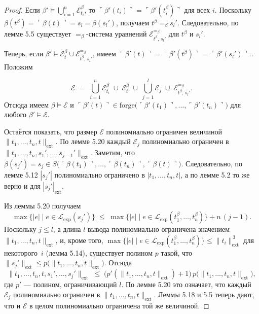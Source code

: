 \begin{proof}
Если \(\beta' \models \bigcup_{i=1}^{n}\mathcal E_{t_i}^{\beta}\),
то \(\ulcorner\beta'(t_i)\urcorner=\ulcorner\beta'(t_i^{\beta})\urcorner\)
для всех \(i\).
Поскольку \(\beta(t^{\beta})=\ulcorner\beta(t)\urcorner=s_{l}=\beta(s_{l}')\),
получаем \(t^{\beta}=_{\beta} s_{l}'\).
Следовательно, по лемме 5.5 существует
\(=_{\beta}\)-система уравнений
\(\mathcal E_{t^{\beta},\,s_{l}'}^{=_{\beta}}\) для \(t^{\beta}\) и \(s_{l}'\).

\smallskip
Теперь, если
\(\beta' \models \mathcal E_{t}^{\beta}\cup\mathcal E_{t^{\beta},\,s_{l}'}^{=_{\beta}}\),
имеем
\(
  \ulcorner\beta'(t)\urcorner
  =\ulcorner\beta'(t^{\beta})\urcorner
  =\ulcorner\beta'(s_{l}')\urcorner.
\). Положим

\[
  \mathcal E \;=\;
  \bigcup_{i=1}^{n} \mathcal E_{t_i}^{\beta}
  \;\cup\;
  \mathcal E_{t}^{\beta}
  \;\cup\;
  \bigcup_{j=1}^{l} \mathcal E_{j}
  \;\cup\;
  \mathcal E_{t^{\beta},\,s_{l}'}^{=_{\beta}} .
\]
Отсюда имеем $\beta\models\mathcal E$ и 
\(
  \ulcorner\beta'(t)\urcorner \in
  \mathrm{forge}\bigl(\ulcorner\beta'(t_{1})\urcorner,\dots,
                     \ulcorner\beta'(t_{n})\urcorner\bigr)
\)
для любого $\beta'\models\mathcal E$.

Остаётся показать, что размер $\mathcal E$ полиномиально ограничен
величиной $\lVert t_{1},\dots,t_{n},t\rVert_{\text{ext}}$.
По лемме 5.20 каждый
\(\mathcal E_{j}\)
полиномиально ограничен
в \(\lVert t_{1},\dots,t_{n},s_{1}',\dots,s_{j-1}'\rVert_{\text{ext}}\).
Заметим, что
\(
  \beta(s_{j}') = s_{j}\in
  S\!\bigl(\ulcorner\beta(t_{1})\urcorner,\dots,\ulcorner\beta(t_{n})\urcorner,\ulcorner\beta(t)\urcorner\bigr)
\).
Следовательно, по лемме 5.12
\(|s_{j}'|\) полиномиально ограничено
в \(|t_{1},\dots,t_{n},t|\),
а по лемме 5.2 то же верно и для
\(|s_{j}'|_{\text{ext}}\).

Из леммы 5.20 получаем
\[
   \max\{|e| \mid e\in \mathcal L_{\text{exp}}(s_{j}')\}
   \;\le\;
   \max\{|e| \mid e\in \mathcal L_{\text{exp}}(t_{1}^{\beta},\dots,t_{n}^{\beta})\}
   + n\,(j-1).
\]
Поскольку \(j\le l\), а длина $l$ вывода полиномиально ограничена
значением \(\lVert t_{1},\dots,t_{n},t\rVert_{\text{ext}}\),
и, кроме того,
\(
   \max\{|e| \mid e\in \mathcal L_{\text{exp}}(t_{1}^{\beta},\dots,t_{n}^{\beta})\}
   \le \lVert t_{i}\rVert_{\text{ext}}^{\,3}
\)
для некоторого~$i$ (лемма 5.14), существует полином $p$
такой, что \(\lVert s_{j}'\rVert_{\text{ext}}\le
p\bigl(\lVert t_{1},\dots,t_{n},t\rVert_{\text{ext}}\bigr)\).
Отсюда
\[
  \lVert t_{1},\dots,t_{n},t,s_{1}',\dots,s_{j}'\rVert_{\text{ext}}
  \;\le\;
  \bigl(p'(\lVert t_{1},\dots,t_{n},t\rVert_{\text{ext}})+1\bigr)\,
  p\bigl(\lVert t_{1},\dots,t_{n},t\rVert_{\text{ext}}\bigr),
\]
где $p'$ — полином, ограничивающий $l$.
По лемме 5.20 это означает, что каждый
\(\mathcal E_{j}\)
полиномиально ограничен
в \(\lVert t_{1},\dots,t_{n},t\rVert_{\text{ext}}\).
Леммы 5.18 и 5.5 теперь дают, что и
\(\mathcal E\)
в целом полиномиально ограничена той же величиной.

\end{proof}

